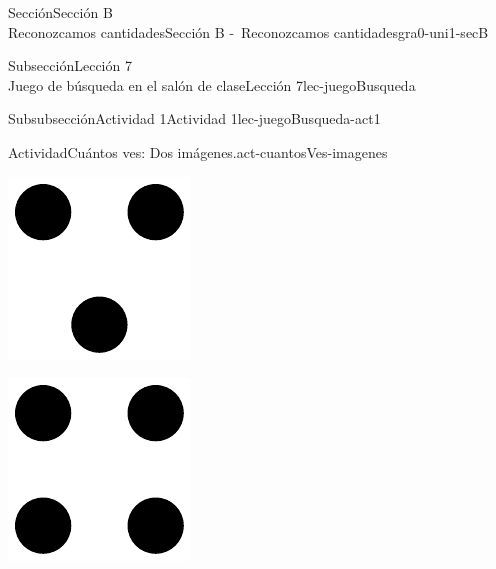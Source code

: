 \begin{sectionptx}{Sección}{{\Large Sección B\\}Reconozcamos cantidades}{}{Sección B -~Reconozcamos cantidades}{}{}{gra0-uni1-secB}
\begin{subsectionptx}{Subsección}{{\normalsize Lección 7\\[-0.05cm]}Juego de búsqueda en el salón de clase}{}{Lección 7}{}{}{lec-juegoBusqueda}
\begin{subsubsectionptx}{Subsubsección}{Actividad 1}{}{Actividad 1}{}{}{lec-juegoBusqueda-act1}
\begin{activity}{Actividad}{Cuántos ves: Dos imágenes.}{act-cuantosVes-imagenes}
\begin{sidebyside}{2}{0}{0}{0}
\begin{sbspanel}{0.5}
\includegraphics[max width=\linewidth, center]{external/svg-source/tikz-file-148152.pdf}
\end{sbspanel}%
\begin{sbspanel}{0.5}%
\includegraphics[max width=\linewidth, center]{external/svg-source/tikz-file-148153.pdf}

\end{sbspanel}
\end{sidebyside}
\end{activity}
\end{subsubsectionptx}
\end{subsectionptx}
\end{sectionptx}
